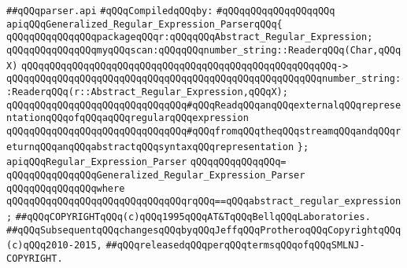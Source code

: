 \label{src/lib/regex/front/parser.api}
\verb|##qQQqparser.api|\newline
\newline
\verb|#qQQqCompiledqQQqby:|\newline
\verb|#qQQqqQQqqQQqqQQqqQQq|\newline
\newline
\verb|apiqQQqGeneralized_Regular_Expression_ParserqQQq{|\newline
\newline
\verb|qQQqqQQqqQQqqQQqpackageqQQqr:qQQqqQQqAbstract_Regular_Expression;|\newline
\newline
\verb|qQQqqQQqqQQqqQQqmyqQQqscan:qQQqqQQqnumber_string::ReaderqQQq(Char,qQQqX)|\newline
\verb|qQQqqQQqqQQqqQQqqQQqqQQqqQQqqQQqqQQqqQQqqQQqqQQqqQQqqQQq->|\newline
\verb|qQQqqQQqqQQqqQQqqQQqqQQqqQQqqQQqqQQqqQQqqQQqqQQqqQQqqQQqnumber_string::ReaderqQQq(r::Abstract_Regular_Expression,qQQqX);|\newline
\newline
\verb|qQQqqQQqqQQqqQQqqQQqqQQqqQQqqQQq#qQQqReadqQQqanqQQqexternalqQQqrepresentationqQQqofqQQqaqQQqregularqQQqexpression|\newline
\verb|qQQqqQQqqQQqqQQqqQQqqQQqqQQqqQQq#qQQqfromqQQqtheqQQqstreamqQQqandqQQqreturnqQQqanqQQqabstractqQQqsyntaxqQQqrepresentation|\newline
\newline
\newline
\verb|};|\newline
\newline
\verb|apiqQQqRegular_Expression_Parser|\newline
\verb|qQQqqQQqqQQqqQQq=|\newline
\verb|qQQqqQQqqQQqqQQqGeneralized_Regular_Expression_Parser|\newline
\verb|qQQqqQQqqQQqqQQqwhere|\newline
\verb|qQQqqQQqqQQqqQQqqQQqqQQqqQQqqQQqrqQQq==qQQqabstract_regular_expression;|\newline
\newline
\newline
\verb|##qQQqCOPYRIGHTqQQq(c)qQQq1995qQQqAT&TqQQqBellqQQqLaboratories.|\newline
\verb|##qQQqSubsequentqQQqchangesqQQqbyqQQqJeffqQQqProtheroqQQqCopyrightqQQq(c)qQQq2010-2015,|\newline
\verb|##qQQqreleasedqQQqperqQQqtermsqQQqofqQQqSMLNJ-COPYRIGHT.|\newline

